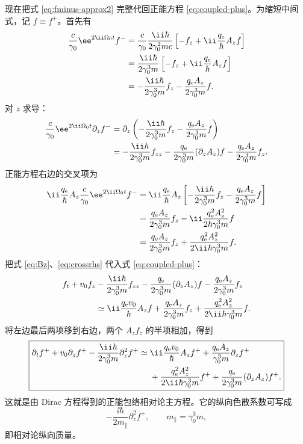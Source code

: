 现在把式 \eqref{eq:fminus-approx2} 完整代回正能方程 \eqref{eq:coupled-plus}。为缩短中间式，记 $f\equiv f^+$。首先有
\begin{align}
 \frac{c}{\gamma_0}\ee^{2\ii\Omega_0t}f^-
 &=\frac{c}{\gamma_0}
 \frac{\ii\hbar}{2\gamma_0^2mc}
 \left[-f_z+\ii\frac{q_{\rm e}}{\hbar}A_zf\right]\\
 &=\frac{\ii\hbar}{2\gamma_0^3m}
 \left[-f_z+\ii\frac{q_{\rm e}}{\hbar}A_zf\right]\\
 &=-\frac{\ii\hbar}{2\gamma_0^3m}f_z
 -\frac{q_{\rm e}A_z}{2\gamma_0^3m}f.
 \label{eq:Bdef}
\end{align}
对 $z$ 求导：
\begin{align}
 \frac{c}{\gamma_0}\ee^{2\ii\Omega_0t}\partial_zf^-
 &=\partial_z\left(
 -\frac{\ii\hbar}{2\gamma_0^3m}f_z
 -\frac{q_{\rm e}A_z}{2\gamma_0^3m}f
 \right)\\
 &=-\frac{\ii\hbar}{2\gamma_0^3m}f_{zz}
 -\frac{q_{\rm e}}{2\gamma_0^3m}(\partial_zA_z)f
 -\frac{q_{\rm e}A_z}{2\gamma_0^3m}f_z.
 \label{eq:Bz}
\end{align}
正能方程右边的交叉项为
\begin{align}
 \ii\frac{q_{\rm e}}{\hbar}A_z
 \frac{c}{\gamma_0}\ee^{2\ii\Omega_0t}f^-
 & =\ii\frac{q_{\rm e}}{\hbar}A_z
 \left[-\frac{\ii\hbar}{2\gamma_0^3m}f_z
 -\frac{q_{\rm e}A_z}{2\gamma_0^3m}f\right]\\
 &=\frac{q_{\rm e}A_z}{2\gamma_0^3m}f_z
 -\ii\frac{q_{\rm e}^2A_z^2}{2\hbar\gamma_0^3m}f\\
 &=\frac{q_{\rm e}A_z}{2\gamma_0^3m}f_z
 +\frac{q_{\rm e}^2A_z^2}{2\ii\hbar\gamma_0^3m}f.
 \label{eq:crossrhs}
\end{align}
把式 \eqref{eq:Bz}、\eqref{eq:crossrhs} 代入式 \eqref{eq:coupled-plus}：
\begin{align}
 f_t+v_0f_z
 &-\frac{\ii\hbar}{2\gamma_0^3m}f_{zz}
 -\frac{q_{\rm e}}{2\gamma_0^3m}(\partial_zA_z)f
 -\frac{q_{\rm e}A_z}{2\gamma_0^3m}f_z\notag\\
 &\simeq
 \ii\frac{q_{\rm e}v_0}{\hbar}A_zf
 +\frac{q_{\rm e}A_z}{2\gamma_0^3m}f_z
 +\frac{q_{\rm e}^2A_z^2}{2\ii\hbar\gamma_0^3m}f.
\end{align}
将左边最后两项移到右边，两个 $A_zf_z$ 的半项相加，得到
\begin{equation}
 \boxed{
 \begin{aligned}
 \partial_t f^+
 +v_0\partial_z f^+
 -\frac{\ii\hbar}{2\gamma_0^3m}\partial_z^2f^+
 \simeq{}&
 \ii\frac{q_{\rm e}v_0}{\hbar}A_zf^+
 +\frac{q_{\rm e}A_z}{\gamma_0^3m}\partial_z f^+\\
 &+\frac{q_{\rm e}^2A_z^2}{2\ii\hbar\gamma_0^3m}f^+
 +\frac{q_{\rm e}}{2\gamma_0^3m}(\partial_zA_z)f^+.
 \end{aligned}}
 \label{eq:rel-master-explicit-check}
\end{equation}
这就是由 Dirac 方程得到的正能包络相对论主方程。它的纵向色散系数可写成
\[
 -\frac{\ii\hbar}{2m_\parallel}\partial_z^2f^+,
 \qquad
 \boxed{m_\parallel=\gamma_0^3m},
\]
即相对论纵向质量。


